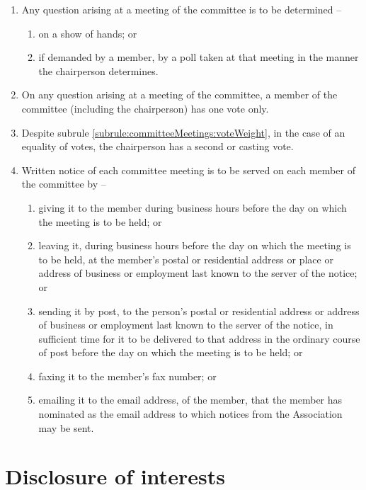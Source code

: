 \documentclass[a4paper,11pt]{article}
\begin{document}
\begin{enumerate}
	\item Any question arising at a meeting of the committee is to be determined --
	\begin{enumerate}
		\item on a show of hands; or
		\item if demanded by a member, by a poll taken at that meeting in the manner the chairperson determines.
	\end{enumerate}
	
	\item \label{subrule:committeeMeetings:voteWeight} On any question arising at a meeting of the committee, a member of the committee (including the chairperson) has one vote only.
	\item Despite subrule \ref{subrule:committeeMeetings:voteWeight}, in the case of an equality of votes, the chairperson has a second or casting vote.

	\item Written notice of each committee meeting is to be served on each member of the committee by --
	\begin{enumerate}
		\item giving it to the member during business hours before the day on which the meeting is to be held; or
		\item leaving it, during business hours before the day on which the meeting is to be held, at the member's postal or residential address or place or address of business or employment last known to the server of the notice; or
		\item sending it by post, to the person's postal or residential address or address of business or employment last known to the server of the notice, in sufficient time for it to be delivered to that address in the ordinary course of post before the day on which the meeting is to be held; or
		\item faxing it to the member's fax number; or
		\item emailing it to the email address, of the member, that the member has nominated as the email address to which notices from the Association may be sent.
	\end{enumerate}
\end{enumerate}

\section{Disclosure of interests}
\label{rule:disclosure}
\end{document}
